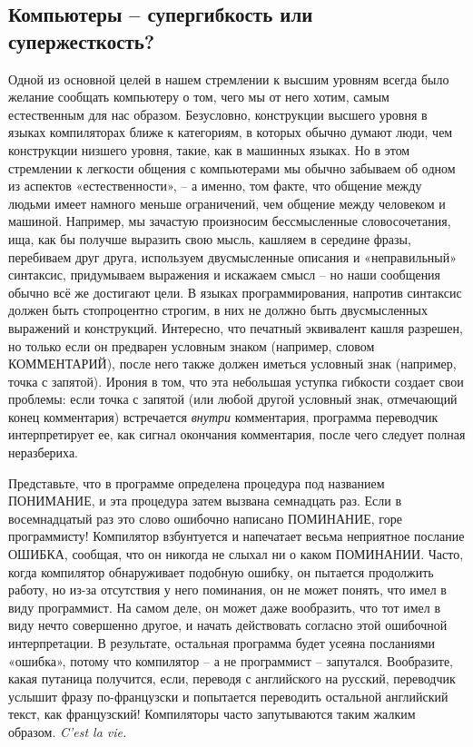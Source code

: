 \documentclass[../main.tex]{subfiles}
\begin{document}
\subsection{Компьютеры \--- супергибкость или супержесткость?}

Одной из основной целей в нашем стремлении к высшим уровням всегда было желание сообщать компьютеру о том, чего мы от него хотим, самым естественным для нас образом. Безусловно, конструкции высшего уровня в языках компиляторах ближе к категориям, в которых обычно думают люди, чем конструкции низшего уровня, такие, как в машинных языках. Но в этом стремлении к легкости общения с компьютерами мы обычно забываем об одном из аспектов «естественности», \--- а именно, том факте, что общение между людьми имеет намного меньше ограничений, чем общение между человеком и машиной. Например, мы зачастую произносим бессмысленные словосочетания, ища, как бы получше выразить свою мысль, кашляем в середине фразы, перебиваем друг друга, используем двусмысленные описания и «неправильный» синтаксис, придумываем выражения и искажаем смысл \--- но наши сообщения обычно всё же достигают цели. В языках программирования, напротив синтаксис должен быть стопроцентно строгим, в них не должно быть двусмысленных выражений и конструкций. Интересно, что печатный эквивалент кашля разрешен, но только если он предварен условным знаком (например, словом КОММЕНТАРИЙ), после него также должен иметься условный знак (например, точка с запятой). Ирония в том, что эта небольшая уступка гибкости создает свои проблемы: если точка с запятой (или любой другой условный знак, отмечающий конец комментария) встречается \emph{внутри} комментария, программа переводчик интерпретирует ее, как сигнал окончания комментария, после чего следует полная неразбериха.

Представьте, что в программе определена процедура под названием ПОНИМАНИЕ, и эта процедура затем вызвана семнадцать раз. Если в восемнадцатый раз это слово ошибочно написано ПОМИНАНИЕ, горе программисту! Компилятор взбунтуется и напечатает весьма неприятное послание ОШИБКА, сообщая, что он никогда не слыхал ни о каком ПОМИНАНИИ\@. Часто, когда компилятор обнаруживает подобную ошибку, он пытается продолжить работу, но из-за отсутствия у него поминания, он не может понять, что имел в виду программист. На самом деле, он может даже вообразить, что тот имел в виду нечто совершенно другое, и начать действовать согласно этой ошибочной интерпретации. В результате, остальная программа будет усеяна посланиями «ошибка», потому что компилятор \--- а не программист \--- запутался. Вообразите, какая путаница получится, если, переводя с английского на русский, переводчик услышит фразу по-французски и попытается переводить остальной английский текст, как французский! Компиляторы часто запутываются таким жалким образом. \emph{C'est la vie.}
\end{document}
